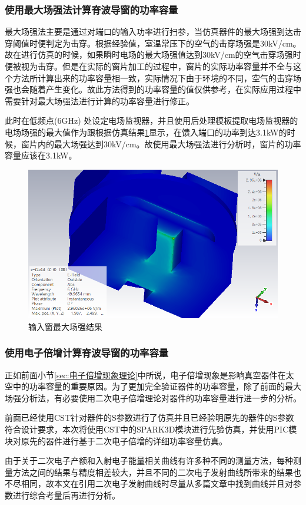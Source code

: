 \documentclass[master]{thesis-uestc}
\begin{document}
\subsubsection{使用最大场强法计算脊波导窗的功率容量}
最大场强法主要是通过对端口的输入功率进行扫参，当仿真器件的最大场强到达击穿阈值时便判定为击穿。根据经验值，室温常压下的空气的击穿场强是30kV/cm。故在进行仿真的时候，如果瞬时电场的最大场强值达到30kV/cm的空气击穿场强时便被视为击穿。但是在实际的窗片加工的过程中，窗片的实际功率容量并不全与这个方法所计算出来的功率容量相一致，实际情况下由于环境的不同，空气的击穿场强也会随着产生变化。故此方法得到的功率容量的值仅供参考，在实际应用过程中需要针对最大场强法进行计算的功率容量进行修正。

此时在低频点(6GHz) 处设定电场监视器，并且使用后处理模板提取电场监视器的电场场强的最大值作为跟根据仿真结果\ref{fig:输入窗最大场强结果}显示，在馈入端口的功率到达3.1kW的时候，窗片内的最大场强达到30kV/cm。故使用最大场强法进行分析时，窗片的功率容量应该在3.1kW。
\begin{figure}[!htb]
    \centering
    \includegraphics[width=0.5\linewidth]{pic/chapter3/X频段最大功率场强.png}
    \caption{输入窗最大场强结果}
    \label{fig:输入窗最大场强结果}
\end{figure}

\subsubsection{使用电子倍增计算脊波导窗的功率容量}
正如前面小节\ref{sec:电子倍增现象理论}中所说，电子倍增现象是影响真空器件在太空中的功率容量的重要原因。为了更加完全验证器件的功率容量，除了前面的最大场强分析法，有必要使用二次电子倍增理论对器件的功率容量进行进一步的分析。

前面已经使用CST针对器件的S参数进行了仿真并且已经验明原先的器件的S参数符合设计要求，本次将使用CST中的SPARK3D模块进行先验仿真，并使用PIC模块对原先的器件进行基于二次电子倍增的详细功率容量仿真。

由于关于二次电子产额和入射电子能量相关曲线有许多种不同的测量方法，每种测量方法之间的结果与精度相差较大，并且不同的二次电子发射曲线所带来的结果也不尽相同，故本文在引用二次电子发射曲线时尽量从多篇文章中找到曲线并且对参数进行综合考量后再进行分析。
\end{document}
